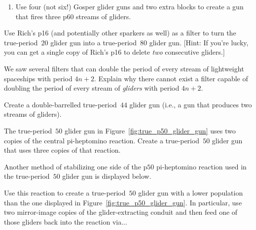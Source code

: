 \begin{multicols}{2}
\begin{problem}
\begin{enumerate}[label=\bf\color{ocre}(\alph*)]
			\item Use four (not six!) Gosper glider guns and two extra blocks to create a gun that fires three p$60$ streams of gliders.
		\end{enumerate}
	\end{problem}
	
	
	\mfilbreak
	
	
	\begin{problem}\label{exer:p80_gun_rich_p16}
		Use Rich's p16 (and potentially other sparkers as well) as a filter to turn the true-period~$20$ glider gun into a true-period~$80$ glider gun. [Hint: If you're lucky, you can get a single copy of Rich's p16 to delete \emph{two} consecutive gliders.]
	\end{problem}
	
	
	\mfilbreak
	
	
	\begin{problem}\label{exer:p4_glider_filter}
		We saw several filters that can double the period of every stream of lightweight spaceships with period $4n+2$. Explain why there cannot exist a filter capable of doubling the period of every stream of \emph{gliders} with period $4n+2$.
	\end{problem}
	
	
	\mfilbreak
	
	
	\begin{problem}\label{exer:p44_double}
		Create a double-barrelled true-period~$44$ glider gun (i.e., a gun that produces two streams of gliders).
	\end{problem}
	
	
	\mfilbreak
	
	
	\begin{problem}\label{exer:p50_triple_gun}
		The true-period~$50$ glider gun in Figure~\ref{fig:true_p50_glider_gun} uses two copies of the central pi-heptomino reaction. Create a true-period~$50$ glider gun that uses three copies of that reaction.
	\end{problem}
	
	
	\mfilbreak
	
	
	\begin{problem}\label{exer:p50_glider_stabilize}
		Another method of stabilizing one side of the p$50$ pi-heptomino reaction used in the true-period~$50$ glider gun is displayed below.
		\begin{center}
		\end{center}
		\noindent Use this reaction to create a true-period~$50$ glider gun with a lower population than the one displayed in Figure~\ref{fig:true_p50_glider_gun}. In particular, use two mirror-image copies of the glider-extracting conduit and then feed one of those gliders back into the reaction via...\smallskip
		

\end{problem}
\end{multicols}
